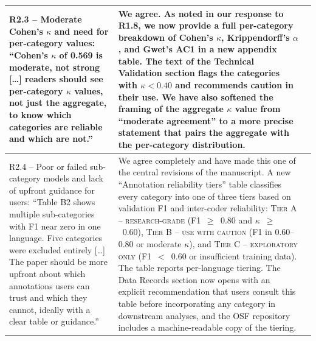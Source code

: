 \documentclass[11pt]{article}
\begin{document}
\begin{landscape}
\begin{longtable}{|L{4cm}|L{12cm}|L{9cm}|}
R2.3 -- Moderate Cohen's $\kappa$ and need for per-category values: \enquote{Cohen's $\kappa$ of 0.569 is moderate, not strong [\dots] readers should see per-category $\kappa$ values, not just the aggregate, to know which categories are reliable and which are not.} &
We agree. As noted in our response to R1.8, we now provide a full per-category breakdown of Cohen's $\kappa$, Krippendorff's $\alpha$, and Gwet's AC1 in a new appendix table. The text of the Technical Validation section flags the categories with $\kappa < 0.40$ and recommends caution in their use. We have also softened the framing of the aggregate $\kappa$ value from \enquote{moderate agreement} to a more precise statement that pairs the aggregate with the per-category distribution. &
\\
\hline

R2.4 -- Poor or failed sub-category models and lack of upfront guidance for users: \enquote{Table B2 shows multiple sub-categories with F1 near zero in one language. Five categories were excluded entirely [\dots] The paper should be more upfront about which annotations users can trust and which they cannot, ideally with a clear table or guidance.} &
We agree completely and have made this one of the central revisions of the manuscript. A new \enquote{Annotation reliability tiers} table classifies every category into one of three tiers based on validation F1 and inter-coder reliability: \textsc{Tier A -- research-grade} (F1~$\geq$~0.80 and $\kappa$~$\geq$~0.60), \textsc{Tier B -- use with caution} (F1 in 0.60--0.80 or moderate $\kappa$), and \textsc{Tier C -- exploratory only} (F1~$<$~0.60 or insufficient training data). The table reports per-language tiering. The Data Records section now opens with an explicit recommendation that users consult this table before incorporating any category in downstream analyses, and the OSF repository includes a machine-readable copy of the tiering. &
\\
\hline


\end{longtable}
\end{landscape}
\end{document}
